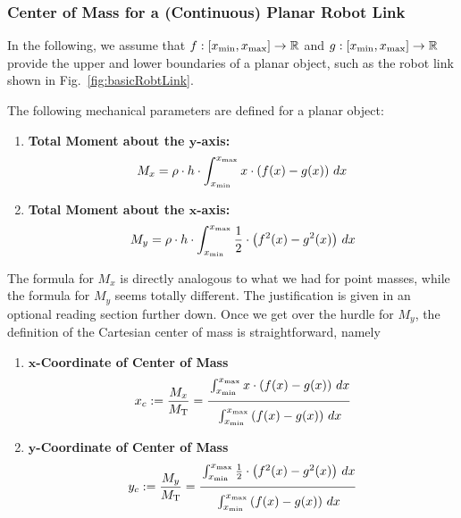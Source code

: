 \subsubsection{Center of Mass for a (Continuous) Planar Robot Link}

\begin{tcolorbox}[colback=mylightblue, title = {\bf Center of Mass in the Plane}, breakable]
In the following, we assume that $f:[x_{\rm min}, x_{\rm max}] \to \mathbb R$ and $g:[x_{\rm min}, x_{\rm max}] \to \mathbb R$ provide the upper and lower boundaries of a planar object, such as the robot link shown in Fig.~\ref{fig:basicRobtLink}. 
\begin{definition}
\label{def:MechanicalParameters}
The following mechanical parameters are defined for a planar object: 
\begin{enumerate}
\renewcommand{\labelenumi}{(\alph{enumi})}
\setlength{\itemsep}{.2cm}
    \item \textbf{Total Moment about the $\bm{y}$-axis:}
\[ M_x = \rho \cdot h \cdot \int_{x_{\rm min}}^{x_{\rm max}} x \cdot \left( f(x)  - g(x) \right)\, dx \]
     \item \textbf{Total Moment about the $\bm{x}$-axis:}
\[ M_y = \rho \cdot h \cdot \int_{x_{\rm min}}^{x_{\rm max}}  \frac{1}{2} \cdot \left( f^2(x)  - g^2(x) \right)\, dx \]
\end{enumerate}
The formula for $M_x$ is directly analogous to what we had for point masses, while the formula for $M_y$ seems totally different. The justification is given in an optional reading section further down. Once we get over the hurdle for $M_y$, the definition of the Cartesian center of mass is straightforward, namely \\
\begin{enumerate}
\renewcommand{\labelenumi}{(\alph{enumi})}
\setcounter{enumi}{2}
\setlength{\itemsep}{.2cm}
    \item $\bm{x}$\textbf{-Coordinate of Center of Mass}
\begin{equation} 
\label{eq:xc}
x_c:= \frac{M_x}{M_{\rm T}} =  \frac{ \vphantom{x _\big| }\int_{x_{\rm min}}^{x_{\rm max}} x \cdot \left( f(x)  - g(x) \right)\, dx}
{ \vphantom{ x^\big| } \int_{x_{\rm min}}^{ x_{\rm max} } \left(f(x) - g(x) \right) \, dx} 
\end{equation}

 \item $\bm{y}$\textbf{-Coordinate of Center of Mass}
\begin{equation} 
\label{eq:yc}
y_c:= \frac{M_y}{M_{\rm T}} =  \frac{ \vphantom{x _\big| }\int_{x_{\rm min}}^{x_{\rm max}} \frac{1}{2} \cdot \left( f^2(x)  - g^2(x) \right)\, dx}
{ \vphantom{ x^\big| } \int_{x_{\rm min}}^{ x_{\rm max} } \left(f(x) - g(x) \right) \, dx} 
\end{equation}
   

\end{enumerate}
\end{definition}
\end{tcolorbox}
